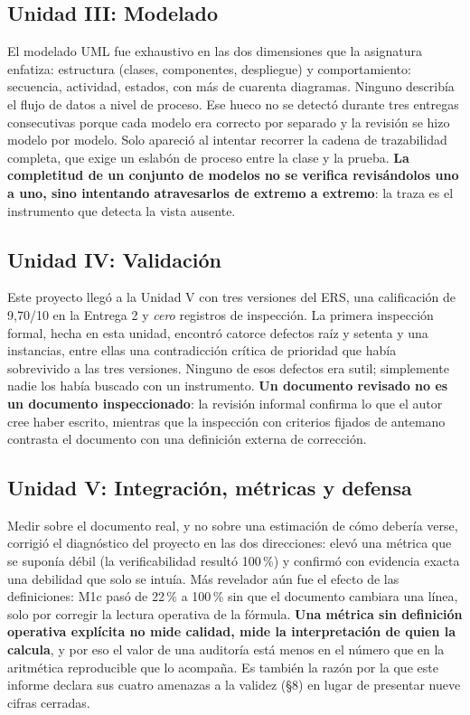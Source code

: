 \subsection{Unidad III: Modelado}

El modelado UML fue exhaustivo en las dos dimensiones que la asignatura enfatiza: estructura (clases, componentes, despliegue) y comportamiento: secuencia, actividad, estados, con m\'as de cuarenta diagramas. Ninguno describ\'ia el flujo de datos a nivel de proceso. Ese hueco no se detect\'o durante tres entregas consecutivas porque cada modelo era correcto por separado y la revisi\'on se hizo modelo por modelo. Solo apareci\'o al intentar recorrer la cadena de trazabilidad completa, que exige un eslab\'on de proceso entre la clase y la prueba. \textbf{La completitud de un conjunto de modelos no se verifica revis\'andolos uno a uno, sino intentando atravesarlos de extremo a extremo}: la traza es el instrumento que detecta la vista ausente.

\subsection{Unidad IV: Validaci\'on}

Este proyecto lleg\'o a la Unidad V con tres versiones del ERS, una calificaci\'on de 9,70/10 en la Entrega 2 y \emph{cero} registros de inspecci\'on. La primera inspecci\'on formal, hecha en esta unidad, encontr\'o catorce defectos ra\'iz y setenta y una instancias, entre ellas una contradicci\'on cr\'itica de prioridad que hab\'ia sobrevivido a las tres versiones. Ninguno de esos defectos era sutil; simplemente nadie los hab\'ia buscado con un instrumento. \textbf{Un documento revisado no es un documento inspeccionado}: la revisi\'on informal confirma lo que el autor cree haber escrito, mientras que la inspecci\'on con criterios fijados de antemano contrasta el documento con una definici\'on externa de correcci\'on.

\subsection{Unidad V: Integraci\'on, m\'etricas y defensa}

Medir sobre el documento real, y no sobre una estimaci\'on de c\'omo deber\'ia verse, corrigi\'o el diagn\'ostico del proyecto en las dos direcciones: elev\'o una m\'etrica que se supon\'ia d\'ebil (la verificabilidad result\'o 100\,\%) y confirm\'o con evidencia exacta una debilidad que solo se intu\'ia. M\'as revelador a\'un fue el efecto de las definiciones: M1c pas\'o de 22\,\% a 100\,\% sin que el documento cambiara una l\'inea, solo por corregir la lectura operativa de la f\'ormula. \textbf{Una m\'etrica sin definici\'on operativa expl\'icita no mide calidad, mide la interpretaci\'on de quien la calcula}, y por eso el valor de una auditor\'ia est\'a menos en el n\'umero que en la aritm\'etica reproducible que lo acompa\~na. Es tambi\'en la raz\'on por la que este informe declara sus cuatro amenazas a la validez (\S8) en lugar de presentar nueve cifras cerradas.

